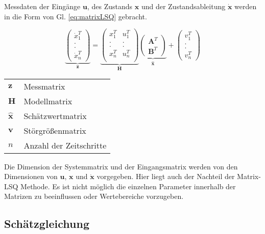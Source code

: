 Messdaten der Eingänge $\textbf{u}$, des Zustands  $\textbf{x}$ und der Zustandsableitung $\dot{\textbf{x}}$ werden in die Form von Gl. \ref{eq:matrixLSQ} gebracht. 

\begin{equation}
    \underbrace{\begin{pmatrix}
        \dot{x}_1^T \\
        . \\
        . \\
        \dot{x}_n^T 
    \end{pmatrix}}_{\textbf{z}} =
    \underbrace{\begin{pmatrix}
        x_{1}^T& u_{1}^T \\
        . & .  \\
        . & .  \\
        x_{n}^T & u_{n}^T \\
    \end{pmatrix}}_{\textbf{H}}
    \underbrace{\begin{pmatrix}
        \textbf{A}^T \\
        \textbf{B}^T
    \end{pmatrix}}_{\hat{\textbf{x}}} +
    \begin{pmatrix}
        v_1^T \\
        . \\
        . \\
        v_n^T
    \end{pmatrix}
\end{equation}\label{eq:matrixLSQ}

\begin{tabular}[\textwidth]{l l}

$\textbf{z}$ & Messmatrix \\
$\textbf{H}$ & Modellmatrix \\
$\hat{\textbf{x}}$ & Schätzwertmatrix \\
$\textbf{v}$ & Störgrößenmatrix \\
$n$ & Anzahl der Zeitschritte \\
\end{tabular}

Die Dimension der Systemmatrix und der Eingangsmatrix werden von den Dimensionen von $\textbf{u}$,  $\textbf{x}$ und $\dot{\textbf{x}}$ vorgegeben. Hier liegt auch der Nachteil der Matrix-LSQ Methode. Es ist nicht möglich die einzelnen Parameter innerhalb der Matrizen zu beeinflussen oder Wertebereiche vorzugeben.


\subsection{Schätzgleichung}

